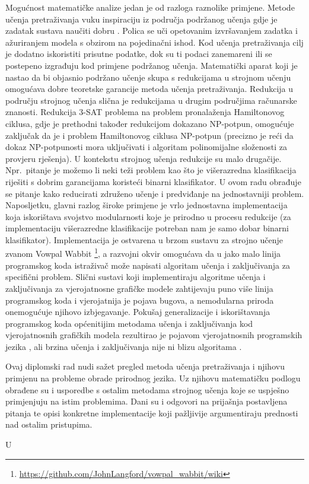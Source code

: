 Mogućnost matematičke analize jedan je od razloga raznolike primjene. Metode
učenja pretraživanja vuku inspiraciju iz područja podržanog učenja
 gdje je zadatak sustava naučiti dobru
. Polica se uči opetovanim
izvršavanjem zadatka i ažuriranjem modela s obzirom na pojedinačni ishod. Kod
učenja pretraživanja cilj je dodatno iskoristiti prisutne podatke, dok su ti
podaci zanemareni ili se postepeno izgrađuju kod primjene podržanog učenja.
Matematički aparat koji je nastao da bi objasnio podržano učenje skupa s
redukcijama u strojnom učenju omogućava dobre teoretske garancije metoda učenja
pretraživanja. Redukcija u području strojnog učenja slična je redukcijama u
drugim područjima računarske znanosti. Redukcija 3-SAT problema na problem
pronalaženja Hamiltonovog ciklusa, gdje je prethodni također redukcijom dokazano
NP-potpun, omogućuje zaključak da je i problem Hamiltonovog ciklusa NP-potpun
(precizno je reći da dokaz NP-potpunosti mora uključivati i algoritam
polinomijalne složenosti za provjeru rješenja). U kontekstu strojnog učenja
redukcije su malo drugačije. Npr.~pitanje je možemo li neki teži problem kao što
je višerazredna klasifikacija riješiti s dobrim garancijama koristeći binarni
klasifikator. U ovom radu obrađuje se pitanje kako reducirati združeno učenje i
predviđanje  na jednostavniji problem.
Naposljetku, glavni razlog široke primjene je vrlo jednostavna implementacija
koja iskorištava svojstvo modularnosti koje je prirodno u procesu redukcije (za
implementaciju višerazredne klasifikacije potreban nam je samo dobar binarni
klasifikator). Implementacija je ostvarena u brzom sustavu za strojno učenje
zvanom Vowpal Wabbit
\footnote{\url{https://github.com/JohnLangford/vowpal_wabbit/wiki}}, a \lts{}
razvojni okvir omogućava da u jako malo linija programskog koda istraživač može
napisati algoritam učenja i zaključivanja za specifični problem. Slični sustavi
koji implementiraju algoritme učenja i zaključivanja za vjerojatnosne grafičke
modele zahtijevaju puno više linija programskog koda i vjerojatnija je pojava
bugova, a nemodularna priroda onemogućuje njihovo izbjegavanje. Pokušaj
generalizacije i iskorištavanja programskog koda općenitijim metodama učenja i
zaključivanja kod vjerojatnosnih grafičkih modela rezultirao je pojavom
vjerojatnosnih programskih jezika ,
ali brzina učenja i zaključivanja nije ni blizu algoritama \lts{}.

Ovaj diplomski rad nudi sažet pregled metoda učenja pretraživanja i njihovu
primjenu na probleme obrade prirodnog jezika. Uz njihovu matematičku podlogu
obrađene su i usporedbe s ostalim metodama strojnog učenja koje se uspješno
primjenjuju na istim problemima. Dani su i odgovori na prijašnja postavljena
pitanja te opisi konkretne implementacije koji pažljivije argumentiraju
prednosti nad ostalim pristupima.

U 
